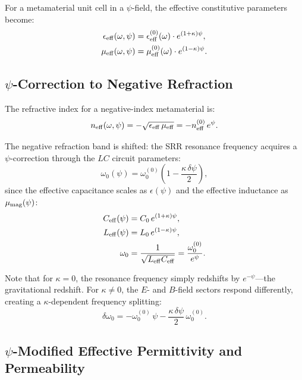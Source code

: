\documentclass[aps,prb,twocolumn,superscriptaddress,floatfix,nofootinbib,longbibliography]{revtex4-2}
\begin{document}
For a metamaterial unit cell in a $\psi$-field, the effective constitutive
parameters become:
\begin{align}
\epsilon_{\rm eff}(\omega,\psi) &= \epsilon_{\rm eff}^{(0)}(\omega)
\cdot e^{(1+\kappa)\psi}, \label{eq:eps-eff-psi}\\
\mu_{\rm eff}(\omega,\psi) &= \mu_{\rm eff}^{(0)}(\omega)
\cdot e^{(1-\kappa)\psi}. \label{eq:mu-eff-psi}
\end{align}

\subsection{$\psi$-Correction to Negative Refraction}

The refractive index for a negative-index metamaterial is:
\begin{equation}
n_{\rm eff}(\omega,\psi) = -\sqrt{\epsilon_{\rm eff}\,\mu_{\rm eff}}
= -n_{\rm eff}^{(0)}\,e^{\psi}.
\label{eq:n-neg-psi}
\end{equation}

The negative refraction band is shifted: the SRR resonance frequency
acquires a $\psi$-correction through the $LC$ circuit parameters:
\begin{equation}
\omega_0(\psi) = \omega_0^{(0)}\left(1 - \frac{\kappa\,\delta\psi}{2}\right),
\label{eq:srr-shift}
\end{equation}
since the effective capacitance scales as $\epsilon(\psi)$ and the
effective inductance as $\mu_{\rm mag}(\psi)$:
\begin{align}
C_{\rm eff}(\psi) &= C_0\,e^{(1+\kappa)\psi}, \label{eq:C-psi}\\
L_{\rm eff}(\psi) &= L_0\,e^{(1-\kappa)\psi}, \label{eq:L-psi}\\
\omega_0 &= \frac{1}{\sqrt{L_{\rm eff}C_{\rm eff}}}
= \frac{\omega_0^{(0)}}{e^{\psi}}. \label{eq:omega0-psi}
\end{align}

Note that for $\kappa = 0$, the resonance frequency simply redshifts by
$e^{-\psi}$---the gravitational redshift.  For $\kappa \neq 0$, the
$E$- and $B$-field sectors respond differently, creating a $\kappa$-dependent
frequency splitting:
\begin{equation}
\delta\omega_0 = -\omega_0^{(0)}\,\psi - \frac{\kappa\,\delta\psi}{2}\,\omega_0^{(0)}.
\label{eq:freq-split}
\end{equation}

\subsection{$\psi$-Modified Effective Permittivity and Permeability}
\end{document}
